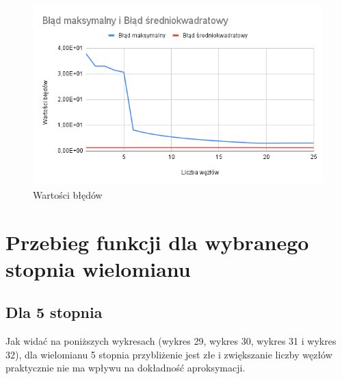 \documentclass{article}
\begin{document}
\begin{figure}[H]
  \centering
  \begin{minipage}[b]{0.4\textwidth}
    \includegraphics[width=\textwidth]{img28.png}
    \caption{Wartości błędów}
  \end{minipage}
\end{figure}

\newpage

\section{Przebieg funkcji dla wybranego stopnia wielomianu}

\subsection{Dla 5 stopnia}

\noindent
Jak widać na poniższych wykresach (wykres 29, wykres 30, wykres 31 i wykres 32), dla wielomianu 5 stopnia przybliżenie jest złe i zwiększanie liczby węzłów praktycznie nie ma wpływu na dokładność aproksymacji.
\end{document}
